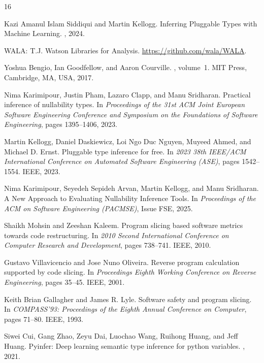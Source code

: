\documentclass[acmsmall,screen,review,anonymous]{acmart}
\begin{document}
\begin{thebibliography}{16}

Kazi Amanul Islam Siddiqui and Martin Kellogg.
\newblock Inferring Pluggable Types with Machine Learning.
, 2024.

{WALA: T.J. Watson Libraries for Analysis}.
\newblock \url{https://github.com/wala/WALA}.

Yoshua Bengio, Ian Goodfellow, and Aaron Courville.
, volume~1.
\newblock MIT Press, Cambridge, MA, USA, 2017.

Nima Karimipour, Justin Pham, Lazaro Clapp, and Manu Sridharan.
\newblock Practical inference of nullability types.
\newblock In {\em Proceedings of the 31st ACM Joint European Software Engineering Conference and Symposium on the Foundations of Software Engineering}, pages 1395--1406, 2023.

Martin Kellogg, Daniel Daskiewicz, Loi Ngo Duc Nguyen, Muyeed Ahmed, and Michael D. Ernst.
\newblock Pluggable type inference for free.
\newblock In {\em 2023 38th IEEE/ACM International Conference on Automated Software Engineering (ASE)}, pages 1542--1554. IEEE, 2023.

Nima Karimipour, Seyedeh Sepideh Arvan, Martin Kellogg, and Manu Sridharan.
\newblock A New Approach to Evaluating Nullability Inference Tools.
\newblock In {\em Proceedings of the ACM on Software Engineering (PACMSE)}, Issue FSE, 2025.

Shaikh Mohsin and Zeeshan Kaleem.
\newblock Program slicing based software metrics towards code restructuring.
\newblock In {\em 2010 Second International Conference on Computer Research and Development}, pages 738--741. IEEE, 2010.

Gustavo Villavicencio and Jose Nuno Oliveira.
\newblock Reverse program calculation supported by code slicing.
\newblock In {\em Proceedings Eighth Working Conference on Reverse Engineering}, pages 35--45. IEEE, 2001.

Keith Brian Gallagher and James R. Lyle.
\newblock Software safety and program slicing.
\newblock In {\em COMPASS'93: Proceedings of the Eighth Annual Conference on Computer}, pages 71--80. IEEE, 1993.

Siwei Cui, Gang Zhao, Zeyu Dai, Luochao Wang, Ruihong Huang, and Jeff Huang.
\newblock Pyinfer: Deep learning semantic type inference for python variables.
, 2021.


\end{thebibliography}
\end{document}
